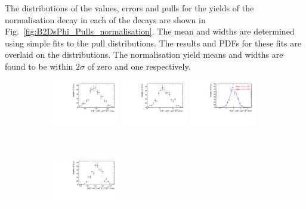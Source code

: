 The distributions of the values, errors and pulls for the yields of the normalisation decay in each of the \Dsp decays are shown in Fig.~\ref{fig:B2DsPhi_Pulls_normalisation}. The mean and widths are determined using simple fits to the pull distributions. The results and PDFs for these fits are overlaid on the distributions. The normalisation yield means and widths are found to be within $2\sigma$ of zero and one respectively.


\begin{figure}[!h]
   \centering
   \begin{subfigure}[t]{1.0\textwidth}
      \includegraphics[width=0.32\textwidth]{figs/B2DsPhi/Plots_DsKK_Value_yield_peak_DsD0_Ds2PhiPi_toy_both_DsBDTbin1_PhiBDTbin1_both_both.pdf}
      \includegraphics[width=0.32\textwidth]{figs/B2DsPhi/Plots_DsKK_Error_yield_peak_DsD0_Ds2PhiPi_toy_both_DsBDTbin1_PhiBDTbin1_both_both.pdf}
      \includegraphics[width=0.32\textwidth]{figs/B2DsPhi/Plots_DsKK_Pull_yield_peak_DsD0_Ds2PhiPi_toy_both_DsBDTbin1_PhiBDTbin1_both_both.pdf}
      \caption{\decay{\Dsp}{\phiz\pip}}
   \end{subfigure}\\
   \begin{subfigure}[t]{1.0\textwidth}
      \includegraphics[width=0.32\textwidth]{figs/B2DsPhi/Plots_DsKK_Value_yield_peak_DsD0_Ds2KKPi_toy_both_DsBDTbin1_PhiBDTbin1_both_both.pdf}

\end{subfigure}
\end{figure}
